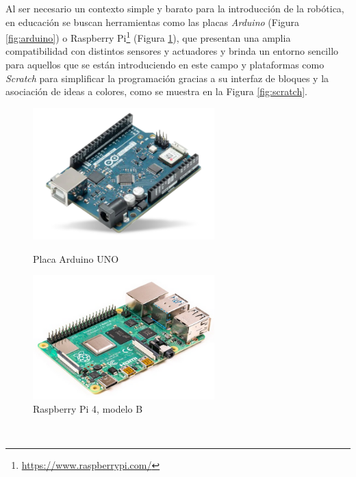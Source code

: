 Al ser necesario un contexto simple y barato para la introducción de la
robótica, en educación se buscan herramientas como las placas \textit{Arduino}
(Figura \ref{fig:arduino}) o Raspberry Pi\footnote{
\href{https://www.raspberrypi.com/}{https://www.raspberrypi.com/}} (Figura
\ref{fig:raspberry_pi}), que presentan una amplia compatibilidad con distintos
sensores y actuadores y brinda un entorno sencillo para aquellos que se están
introduciendo en este campo y plataformas como \textit{Scratch} para simplificar
la programación gracias a su interfaz de bloques y la asociación de ideas a
colores, como se muestra en la Figura \ref{fig:scratch}.

\begin{figure}[h!]
  \centering
  \begin{minipage}{0.45\textwidth}
    \centering
    \includegraphics[width=7cm]{figs/arduino}
    \caption{Placa Arduino UNO \cite{arduino_uno}}
    \label{fig:arduino}
  \end{minipage}
  \hfill
  \begin{minipage}{0.45\textwidth}
    \centering
    \includegraphics[width=7cm]{figs/raspberry_pi_4b}
    \caption{Raspberry Pi 4, modelo B \cite{raspberry_pi_4b}}
    \label{fig:raspberry_pi}
  \end{minipage}
\end{figure}\

